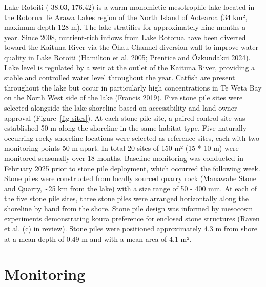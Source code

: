 \documentclass[
  12pt,
  a4paper,
]{scrbook}
\begin{document}
Lake Rotoiti (-38.03, 176.42) is a warm monomictic mesotrophic lake
located in the Rotorua Te Arawa Lakes region of the North Island of
Aotearoa (34 km², maximum depth 128 m). The lake stratifies for
approximately nine months a year. Since 2008, nutrient-rich inflows from
Lake Rotorua have been diverted toward the Kaituna River via the Ōhau
Channel diversion wall to improve water quality in Lake Rotoiti
(Hamilton et al. 2005; Prentice and Özkundakci 2024). Lake level is
regulated by a weir at the outlet of the Kaituna River, providing a
stable and controlled water level throughout the year. Catfish are
present throughout the lake but occur in particularly high
concentrations in Te Weta Bay on the North West side of the lake
(Francis 2019). Five stone pile sites were selected alongside the lake
shoreline based on accessibility and land owner approval
(Figure~\ref{fig-sites}). At each stone pile site, a paired control site
was established 50 m along the shoreline in the same habitat type. Five
naturally occurring rocky shoreline locations were selected as reference
sites, each with two monitoring points 50 m apart. In total 20 sites of
150 m² (15 * 10 m) were monitored seasonally over 18 months. Baseline
monitoring was conducted in February 2025 prior to stone pile
deployment, which occurred the following week. Stone piles were
constructed from locally sourced quarry rock (Manawahe Stone and Quarry,
\textasciitilde25 km from the lake) with a size range of 50 - 400 mm. At
each of the five stone pile sites, three stone piles were arranged
horizontally along the shoreline by hand from the shore. Stone pile
design was informed by mesocosm experiments demonstrating kōura
preference for enclosed stone structures (Raven et al. (c) in review).
Stone piles were positioned approximately 4.3 m from shore at a mean
depth of 0.49 m and with a mean area of 4.1 m².

\section{Monitoring}\label{monitoring}
\end{document}
